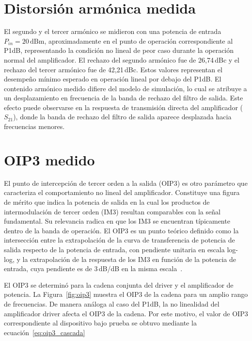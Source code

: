 \section{Distorsión armónica medida}
El segundo y el tercer armónico se midieron con una potencia de entrada $P_{in} = 20\,\text{dBm}$, aproximadamente en el punto de operación correspondiente al P1dB, representando la condición no lineal de peor caso durante la operación normal del amplificador. El rechazo del segundo armónico fue de 26{,}74\,dBc y el rechazo del tercer armónico fue de 42{,}21\,dBc. Estos valores representan el desempeño mínimo esperado en operación lineal por debajo del P1dB. El contenido armónico medido difiere del modelo de simulación, lo cual se atribuye a un desplazamiento en frecuencia de la banda de rechazo del filtro de salida. Este efecto puede observarse en la respuesta de transmisión directa del amplificador ($S_{21}$), donde la banda de rechazo del filtro de salida aparece desplazada hacia frecuencias menores.

\section{OIP3 medido}
El punto de intercepción de tercer orden a la salida (OIP3) es otro parámetro que caracteriza el comportamiento no lineal del amplificador. Constituye una figura de mérito que indica la potencia de salida en la cual los productos de intermodulación de tercer orden (IM3) resultan comparables con la señal fundamental. Su relevancia radica en que los IM3 se encuentran típicamente dentro de la banda de operación. El OIP3 es un punto teórico definido como la intersección entre la extrapolación de la curva de transferencia de potencia de salida respecto de la potencia de entrada, con pendiente unitaria en escala log-log, y la extrapolación de la respuesta de los IM3 en función de la potencia de entrada, cuya pendiente es de 3\,dB/dB en la misma escala~\cite{pozar2011}.

El OIP3 se determinó para la cadena conjunta del driver y el amplificador de potencia. La Figura~\ref{fig:oip3} muestra el OIP3 de la cadena para un amplio rango de frecuencias. De manera análoga al caso del P1dB, la no linealidad del amplificador driver afecta el OIP3 de la cadena. Por este motivo, el valor de OIP3 correspondiente al dispositivo bajo prueba se obtuvo mediante la ecuación~\eqref{eq:oip3_cascada}

